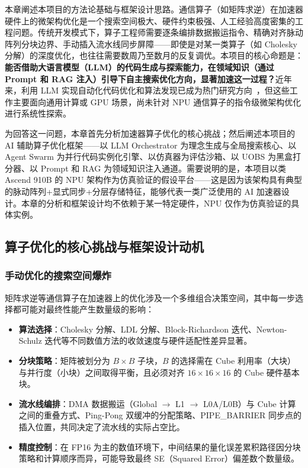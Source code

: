 \documentclass{CjC}
\begin{document}
    本章阐述本项目的方法论基础与框架设计思路。通信算子（如矩阵求逆）在加速器硬件上的微架构优化是一个搜索空间极大、硬件约束极强、人工经验高度密集的工程问题。传统开发模式下，算子工程师需要逐条编排数据搬运指令、精确对齐脉动阵列分块边界、手动插入流水线同步屏障——即使是对某一类算子（如
    Cholesky
    分解）的深度优化，也往往需要数周乃至数月的反复调优。本项目的核心命题是：\textbf{能否借助大语言模型（LLM）的代码生成与探索能力，在领域知识（通过
    Prompt 和 RAG 注入）引导下自主搜索优化方向，显著加速这一过程？}近年来，利用 LLM
    实现自动化代码优化和算法发现已成为热门研究方向~\cite{novikov2025alphaevolve,hong2025autocomp,tang2025reasoningcompiler}，但这些工作主要面向通用计算或
    GPU 场景，尚未针对 NPU 通信算子的指令级微架构优化进行系统性探索。

    为回答这一问题，本章首先分析加速器算子优化的核心挑战；然后阐述本项目的 AI 辅助算子优化框架——以
    LLM Orchestrator 为理念生成与全局搜索核心、以 Agent Swarm 为并行代码实例化引擎、以仿真器为评估沙箱、以
    UOBS 为黑盒打分器、以 Prompt 和 RAG 为领域知识注入通道。需要说明的是，本项目以类
    Ascend 910B 的 NPU 架构作为仿真验证的假设平台——这是因为该架构具有典型的脉动阵列+显式同步+分层存储特征，能够代表一类广泛使用的
    AI 加速器设计。本章的分析和框架设计均不依赖于某一特定硬件，NPU 仅作为仿真验证的具体实例。

    \subsection{算子优化的核心挑战与框架设计动机}

    \subsubsection{手动优化的搜索空间爆炸}

    矩阵求逆等通信算子在加速器上的优化涉及一个多维组合决策空间，其中每一步选择都可能对最终性能产生数量级的影响：

    \begin{itemize}
        \item \textbf{算法选择}：Cholesky 分解、LDL 分解、Block-Richardson 迭代、Newton-Schulz
            迭代等不同数值方法的收敛速度与硬件适配性差异显著。

        \item \textbf{分块策略}：矩阵被划分为 $B \times B$ 子块，$B$ 的选择需在
            Cube 利用率（大块）与并行度（小块）之间取得平衡，且必须对齐
            $16 \times 16 \times 16$ 的 Cube 硬件基本块。

        \item \textbf{流水线编排}：DMA 数据搬运（Global $\rightarrow$ L1 $\rightarrow$
            L0A/L0B）与 Cube 计算之间的重叠方式、Ping-Pong 双缓冲的分配策略、PIPE\_BARRIER
            同步点的插入位置，共同决定了流水线的实际占空比。

        \item \textbf{精度控制}：在 FP16 为主的数值环境下，中间结果的量化误差累积路径因分块策略和计算顺序而异，可能导致最终
            SE（Squared Error）偏差数个数量级。
    \end{itemize}
\end{document}
